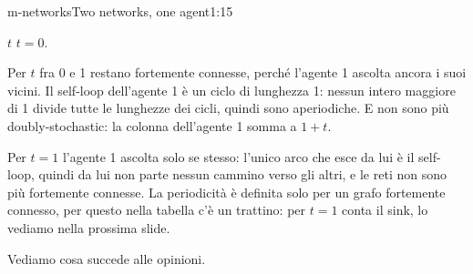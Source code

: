 \begin{slidedue}{m-networks}{Two networks, one agent}{1:15 {\color{red}}}
\begin{discorso}
    \item {\color{red}          } {\color{red}$t$} {\color{red}        } {\color{red}$t=0$.}
    \item Per $t$ fra 0 e 1 restano fortemente connesse, perché l'agente 1 ascolta ancora i suoi vicini. Il self-loop dell'agente 1 è un ciclo di lunghezza 1: nessun intero maggiore di 1 divide tutte le lunghezze dei cicli, quindi sono aperiodiche. E non sono più doubly-stochastic: la colonna dell'agente 1 somma a $1+t$.
    \item Per $t=1$ l'agente 1 ascolta solo se stesso: {\color{blue}l'unico arco che esce da lui è il self-loop, quindi} da lui non {\color{red}} {\color{blue}parte} nessun {\color{red} } {\color{blue}cammino verso gli altri, e} le reti non sono più fortemente connesse. La periodicità è definita solo per un grafo fortemente connesso, per questo nella tabella c'è un trattino: per $t=1$ conta il sink, lo vediamo nella prossima slide.
    \item {\color{red}              }
    \item Vediamo cosa succede alle opinioni.
  \end{discorso}
\end{slidedue}

